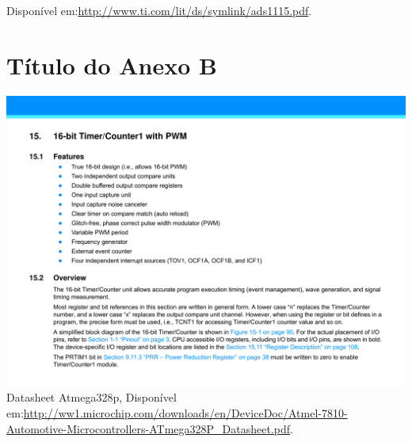 \begin{anexosenv}
	\FloatBarrier
	Disponível em:\url{http://www.ti.com/lit/ds/symlink/ads1115.pdf}.
%

	
	\chapter{Título do Anexo B}
	\includegraphics[scale=0.3]{Anexos/Atmel-089.png}
		\FloatBarrier
	Datasheet Atmega328p, Disponível em:\url{http://ww1.microchip.com/downloads/en/DeviceDoc/Atmel-7810-Automotive-Microcontrollers-ATmega328P_Datasheet.pdf}.

\end{anexosenv}